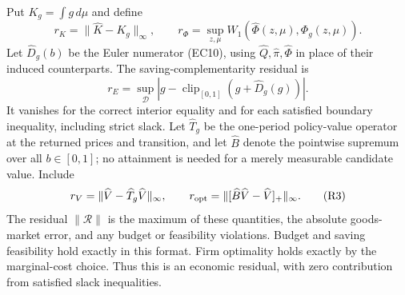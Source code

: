 \documentclass[11pt,a4paper]{article}
\begin{document}
Put $K_g=\int g\,d\mu$ and define
\[
 r_K=\|\widehat K-K_g\|_\infty,\qquad
 r_\Phi=\sup_{z,\mu}W_1(\widehat\Phi(z,\mu),\Phi_g(z,\mu)).
 \tag{R1}
\]
Let $\widehat D_g(b)$ be the Euler numerator \textup{(EC10)}, using
$\widehat Q,\widehat\pi,\widehat\Phi$ in place of their induced
counterparts. The saving-complementarity residual is
\[
 r_E=\sup_{\mathcal D}
 \left|g-\operatorname{clip}_{[0,1]}(g+\widehat D_g(g))\right|.
 \tag{R2}
\]
It vanishes for the correct interior equality and for each satisfied
boundary inequality, including strict slack. Let $\widehat T_g$ be the
one-period policy-value operator at the returned prices and transition,
and let $\widehat B$ denote the pointwise supremum over all $b\in[0,1]$; no attainment is needed for a merely measurable candidate value. Include
\[
 r_V=\|\widehat V-\widehat T_g\widehat V\|_\infty,
 \qquad
 r_{\rm opt}=\|[\widehat B\widehat V-\widehat V]_+\|_\infty.
 \tag{R3}
\]
The residual $\|\mathcal R\|$ is the maximum of these quantities,
the absolute goods-market error, and any budget or feasibility violations.
Budget and saving feasibility hold exactly in this format. Firm optimality
holds exactly by the marginal-cost choice. Thus this is an economic
residual, with zero contribution from satisfied slack inequalities.
\end{document}

